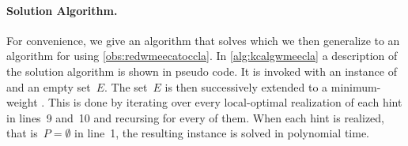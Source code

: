 \paragraph{Solution Algorithm.} For convenience, we give an algorithm that solves \pWMEECCLAs{} which we then generalize to an algorithm for \pWMEECAs{} using \autoref{obs:redwmeecatoccla}. In \autoref{alg:kcalgwmeecla} a description of the solution algorithm is shown in pseudo code. It is invoked with an instance of \pWMEECCLAs{} and an empty set~$E$. The set~$E$ is then successively extended to a minimum-weight \EE . This is done by iterating over every local-optimal realization of each hint in lines~9 and~10 and recursing for every of them. When each hint is realized, that is~$P = \emptyset$ in line~1, the resulting instance is solved in polynomial time.

